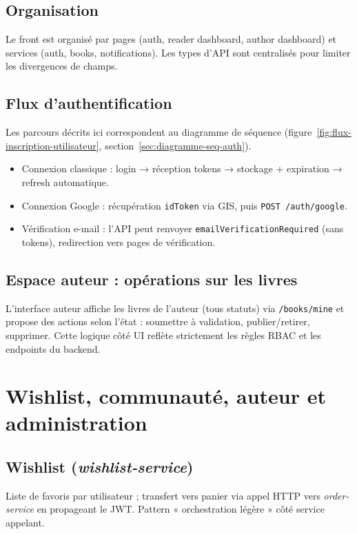 \documentclass[12pt,a4paper]{report}
\begin{document}
\subsection{Organisation}
Le front est organisé par pages (auth, reader dashboard, author dashboard) et services (auth, books, notifications). Les types d'API sont centralisés pour limiter les divergences de champs.\par

\subsection{Flux d'authentification}
Les parcours décrits ici correspondent au diagramme de séquence (figure~\ref{fig:flux-inscription-utilisateur}, section~\ref{sec:diagramme-seq-auth}).\par
\begin{itemize}
  \item Connexion classique : login → réception tokens → stockage + expiration → refresh automatique.
  \item Connexion Google : récupération \texttt{idToken} via GIS, puis \texttt{POST /auth/google}.
  \item Vérification e-mail : l'API peut renvoyer \texttt{emailVerificationRequired} (sans tokens), redirection vers pages de vérification.\par
\end{itemize}

\subsection{Espace auteur : opérations sur les livres}
L'interface auteur affiche les livres de l'auteur (tous statuts) via \texttt{/books/mine} et propose des actions selon l'état :
soumettre à validation, publier/retirer, supprimer. Cette logique côté UI reflète strictement les règles RBAC et les endpoints du backend.\par

\section{Wishlist, communauté, auteur et administration}
\subsection{Wishlist (\textit{wishlist-service})}
Liste de favoris par utilisateur ; transfert vers panier via appel HTTP vers \textit{order-service} en propageant le JWT. Pattern « orchestration légère » côté service appelant.\par
\end{document}
